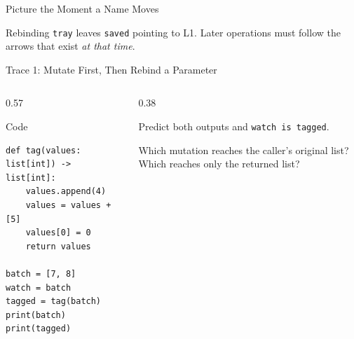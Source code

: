\documentclass[aspectratio=169,10pt]{beamer}
\begin{document}
\begin{frame}{Picture the Moment a Name Moves}
  \begin{center}
    \resizebox{0.94\linewidth}{!}{\warmupdiagram}
  \end{center}
  \begin{keyidea}
    Rebinding \texttt{tray} leaves \texttt{saved} pointing to L1. Later operations must follow the arrows that exist \emph{at that time}.
  \end{keyidea}
\end{frame}


\begin{frame}[fragile]{Trace 1: Mutate First, Then Rebind a Parameter}
  \begin{columns}[T,onlytextwidth]
    \begin{column}{0.57\textwidth}
      \begin{block}{Code}
\begin{verbatim}
def tag(values: list[int]) -> list[int]:
    values.append(4)
    values = values + [5]
    values[0] = 0
    return values

batch = [7, 8]
watch = batch
tagged = tag(batch)
print(batch)
print(tagged)
\end{verbatim}
      \end{block}
    \end{column}
    \begin{column}{0.38\textwidth}
      \begin{activity}
        Predict both outputs and \texttt{watch is tagged}.

        Which mutation reaches the caller's original list? Which reaches only the returned list?
      \end{activity}
    \end{column}
  \end{columns}
\end{frame}
\end{document}
